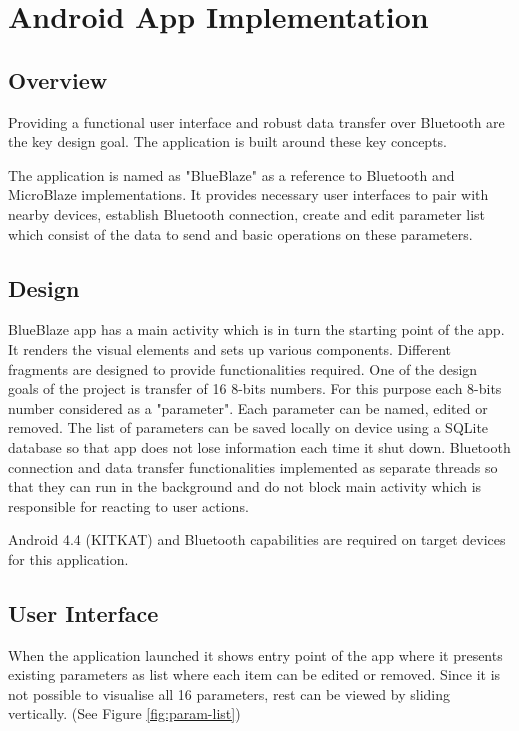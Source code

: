 \chapter{Android App Implementation}

\section{Overview}
Providing a functional user interface and robust data transfer over Bluetooth are the key design goal. The application is built around these key concepts. 

The application is named as "BlueBlaze" as a reference to Bluetooth and MicroBlaze implementations. It provides necessary user interfaces to pair with nearby devices, establish Bluetooth connection, create and edit parameter list which consist of the data to send and basic operations on these parameters. 


\section{Design}
BlueBlaze app has a main activity which is in turn the starting point of the app. It renders the visual elements and sets up various components. Different fragments are designed to provide functionalities required. One of the design goals of the project is transfer of 16 8-bits numbers. For this purpose each 8-bits number considered as a "parameter". Each parameter can be named, edited or removed. The list of parameters can be saved locally on device using a SQLite database so that app does not lose information each time it shut down. Bluetooth connection and data transfer functionalities implemented as separate threads so that they can run in the background and do not block main activity which is responsible for reacting to user actions.

Android 4.4 (KITKAT) and Bluetooth capabilities are required on target devices for this application.


\section{User Interface}

When the application launched it shows entry point of the app where it presents existing parameters as list where each item can be edited or removed. Since it is not possible to visualise all 16 parameters, rest can be viewed by sliding vertically. (See Figure \ref{fig:param-list})


